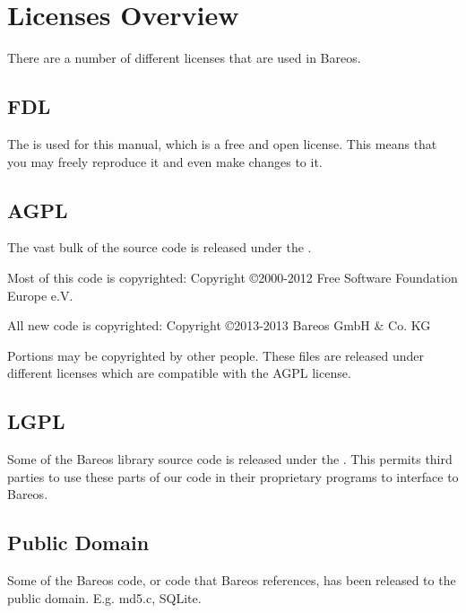 
\section{Licenses Overview}

There are a number of different licenses that are used in Bareos.

\subsection*{FDL}

The  is used for this manual,
which is a free and open license. This means that you may freely
reproduce it and even make changes to it.


\subsection*{AGPL}

The vast bulk of the source code is released under the
.

Most of this code is copyrighted: Copyright \copyright 2000-2012
Free Software Foundation Europe e.V.

All new code is copyrighted: Copyright \copyright 2013-2013 Bareos GmbH & Co. KG

Portions may be copyrighted by other people.  These files are released
under different licenses which are compatible with the AGPL license.

\subsection*{LGPL}

Some of the Bareos library source code is released under the
. This
permits third parties to use these parts of our code in their proprietary
programs to interface to Bareos.

\subsection*{Public Domain}

Some of the Bareos code, or code that Bareos references, has been released
to the public domain. E.g. md5.c, SQLite.

